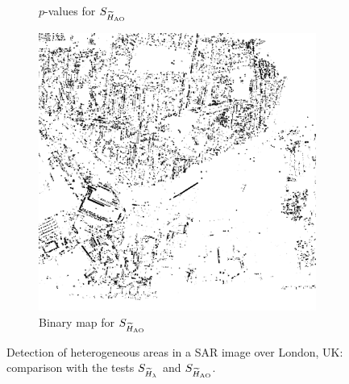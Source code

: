 \documentclass[
  journal,
]{IEEEtran}%
\begin{document}
\begin{figure}[hbt]
\begin{subfigure}{0.22\textwidth}
        \caption{$p$-values for $\tiny{S_{\widetilde{H}_{\text{AO}}}}$ }
        \label{fig:1d}
    \end{subfigure}
    \begin{subfigure}{0.17\textwidth}
        \includegraphics[width=\linewidth]{./Figures/H_005_london_shannon.png}
        \caption{Binary map for $\small{S_{\widetilde{H}_{\text{AO}}}}$}
        \label{fig:1e}
    \end{subfigure}
    \caption{Detection of heterogeneous areas in a SAR image over London, UK: comparison with the tests $\small{S_{\widetilde{H}_{\lambda}}}$ and $\small{S_{\widetilde{H}_{\text{AO}}}}$.  }
    \label{fig:london}
\end{figure}
\end{document}
